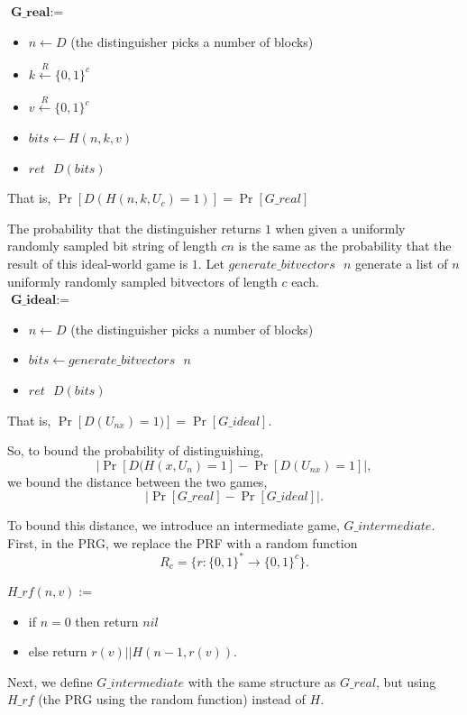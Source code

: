 \documentclass[12pt,lot, lof]{puthesis}
\newenvironment{game}
{ \begin{itemize}[noitemsep,nolistsep] 
}
{ \end{itemize}                  }
\newcommand{\s} {\textrm{ }}
\begin{document}
$\textbf{G\_real} := $
\begin{game}
\item[] $n \leftarrow D$ (the distinguisher picks a number of blocks)
\item[] $k \xleftarrow{R} \{0,1\}^c$
\item[] $v \xleftarrow{R} \{0,1\}^c$
\item[] $bits \leftarrow H(n,k,v)$
\item[] $ret \s D(bits)$ \\
\end{game}

That is, $\Pr[D(H(n, k, U_c) = 1)] = \Pr[G\_real]$

The probability that the distinguisher returns $1$ when given a uniformly randomly sampled bit string of length $cn$ is the same as the probability that the result of this ideal-world game is $1$. Let $generate\_bitvectors \s n$ generate a list of $n$ uniformly randomly sampled bitvectors of length $c$ each.\\

$\textbf{G\_ideal} := $
\begin{game}
\item[] $n \leftarrow D$ (the distinguisher picks a number of blocks)
\item[] $bits \leftarrow generate\_bitvectors \s n$
\item[] $ret \s D(bits)$ \\
\end{game}

That is, $\Pr[D(U_{nx}) = 1)] = \Pr[G\_ideal]$.

So, to bound the probability of distinguishing, $$| \Pr [ D (H (x, U_n) = 1] - \Pr [ D(U_{nx}) = 1] |,$$ we bound the distance between the two games, $$| \Pr[G\_real] - \Pr[G\_ideal]|.$$ 

To bound this distance, we introduce an intermediate game, $G\_intermediate$. First, in the PRG, we replace the PRF with a random function $$R_c = \{ r : \{0,1\}^* \rightarrow \{0,1\}^c\}.$$ 

$H\_{rf}(n, v) :=$
\begin{game}
\item[] if $n = 0$ then return $nil$
\item[] else return $r(v) || H(n-1, r(v)).$\\
\end{game}

Next, we define $G\_intermediate$ with the same structure as $G\_real$, but using $H\_{rf}$ (the PRG using the random function) instead of $H$.\\
\end{document}
